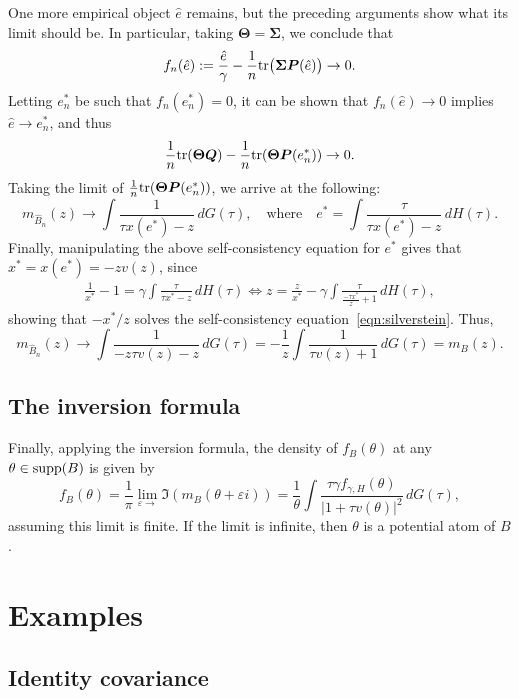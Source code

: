 \documentclass{article}
\newcommand{\bSigma}{\boldsymbol{\Sigma}}
\newcommand{\bTheta}{\boldsymbol{\Theta}}
\newcommand{\bQ}{\boldsymbol{Q}}
\newcommand{\bP}{\boldsymbol{P}}
\begin{document}
One more empirical object $\hat{e}$ remains, but the preceding arguments show what its limit should be. In particular, taking $\bTheta = \bSigma$, we conclude that
$$
f_n(\hat{e}) := \frac{\hat{e}}{\gamma} - \frac{1}{n}\tr\big(\bSigma \bP(\hat{e})\big) \to 0.
$$
Letting $e_n^{\ast}$ be such that $f_n(e_n^{\ast}) = 0$, it can be shown that $f_n(\hat{e}) \to 0$ implies $\hat{e} \to e_n^{\ast}$, and thus
\begin{equation}
	\frac{1}{n}\tr(\bTheta \bQ) - \frac{1}{n}\tr(\bTheta \bP(e_n^{\ast})) \to 0.
\end{equation}
Taking the limit of $\frac{1}{n}\tr(\bTheta \bP(e_n^{\ast}))$, we arrive at the following:
$$
m_{\hat{B}_n}(z) \to \int \frac{1}{\tau x(e^{\ast}) - z} \,dG(\tau), \quad \textrm{where} \quad e^{\ast} = \int \frac{\tau}{\tau x(e^{\ast}) - z} \,dH(\tau).
$$
Finally, manipulating the above self-consistency equation for $e^{\ast}$ gives that $x^{\ast} = x(e^{\ast}) = -z v(z)$, since
\begin{align*}
	\frac{1}{x^{\ast}} - 1 = \gamma \int \frac{\tau}{\tau x^{\ast} - z} \,dH(\tau) \Longleftrightarrow z = \frac{z}{x^{\ast}} - \gamma \int \frac{\tau}{\frac{-\tau x^{\ast}}{z} + 1} \,dH(\tau),
\end{align*}
showing that $-x^{\ast}/z$ solves the self-consistency equation~\eqref{eqn:silverstein}. Thus, 
$$
m_{\hat{B}_n}(z) \to \int \frac{1}{-z \tau v(z) - z} \,dG(\tau) = -\frac{1}{z} \int \frac{1}{\tau v(z) + 1} \,dG(\tau) = m_{B}(z).
$$
\subsection{The inversion formula}
Finally, applying the inversion formula, the density of $f_{B}(\theta)$ at any $\theta \in \mathrm{supp}(B)$ is given by
$$
f_{B}(\theta) = \frac{1}{\pi}\lim_{\varepsilon \to} \Im(m_B(\theta + \varepsilon i)) = \frac{1}{\theta} \int \frac{\tau \gamma f_{\gamma,H}(\theta)}{|1 + \tau v(\theta)|^2} \,dG(\tau),
$$
assuming this limit is finite. If the limit is infinite, then $\theta$ is a potential atom of $B$. 

\section{Examples}

\subsection{Identity covariance}
\end{document}
